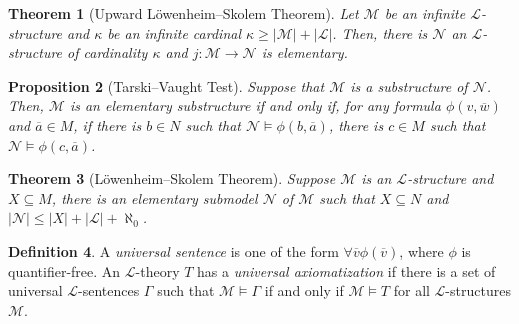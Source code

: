 \documentclass{amsart}
\newtheorem{theorem}{Theorem}[subsection]
\newtheorem{lemma}[theorem]{Lemma}
\newtheorem{proposition}[theorem]{Proposition}
\theoremstyle{definition}
\newtheorem{definition}[theorem]{Definition}
\numberwithin{equation}{section}
\begin{document}
\begin{theorem}[Upward L\"owenheim--Skolem Theorem]
	Let $\mathcal{M}$ be an infinite $\mathcal{L}$-structure and
	$\kappa$ be an infinite cardinal $\kappa \ge |\mathcal{M}| + |\mathcal{L}|$.
	Then, there is $\mathcal{N}$ an $\mathcal{L}$-structure of cardinality $\kappa$ and $j: \mathcal{M} \to \mathcal{N}$ is elementary.
\end{theorem}

\begin{proposition}[Tarski--Vaught Test]
	Suppose that $\mathcal{M}$ is a substructure of $\mathcal{N}$.
	Then, $\mathcal{M}$ is an elementary substructure if and only if,
	for any formula $\phi(v,\overline{w})$ and $\overline{a} \in M$,
	if there is $b \in N$ such that $\mathcal{N} \models \phi(b,\overline{a})$,
	there is $c \in M$ such that $\mathcal{N} \models \phi(c,\overline{a})$.
\end{proposition}




\begin{theorem}[L\"owenheim--Skolem Theorem]
	Suppose $\mathcal{M}$ is an $\mathcal{L}$-structure and
	$X \subseteq M$, there is an elementary submodel $\mathcal{N}$ of $\mathcal{M}$
	such that $X \subseteq N$ and $|\mathcal{N}| \le |X| + |\mathcal{L}| + \aleph_0$.
\end{theorem}

\begin{definition}
	A \emph{universal sentence} is one of the form
	$\forall \overline{v} \phi(\overline{v})$,
	where $\phi$ is quantifier-free.
	An $\mathcal{L}$-theory $T$ has a \emph{universal axiomatization} if there is a set of universal $\mathcal{L}$-sentences $\Gamma$
	such that $\mathcal{M} \models \Gamma$ if and only if $\mathcal{M} \models T$ for all $\mathcal{L}$-structures $\mathcal{M}$.
\end{definition}
\end{document}
